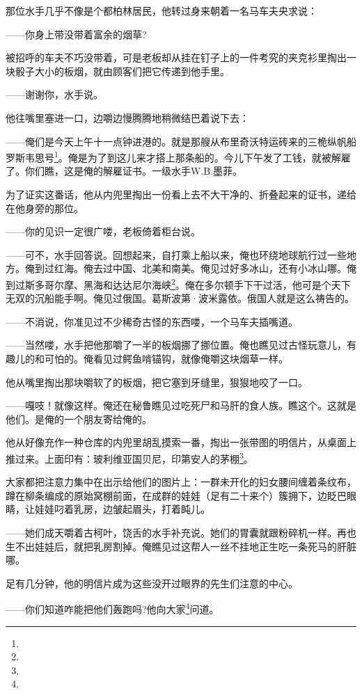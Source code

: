 \par 那位水手几乎不像是个都柏林居民，他转过身来朝着一名马车夫央求说：
\par ——你身上带没带着富余的烟草?
\par 被招呼的车夫不巧没带着，可是老板却从挂在钉子上的一件考究的夹克衫里掏出一块骰子大小的板烟，就由顾客们把它传递到他手里。
\par ——谢谢你，水手说。
\par 他往嘴里塞进一口，边嚼边慢腾腾地稍微结巴着说下去：
\par ——俺们是今天上午十一点钟进港的。就是那艘从布里奇沃特运砖来的三桅纵帆船罗斯韦思号\footnote{}。俺是为了到这儿来才搭上那条船的。今儿下午发了工钱，就被解雇了。你们瞧，这是俺的解雇证书。一级水手W.B.墨菲。
\par 为了证实这番话，他从内兜里掏出一份看上去不大干净的、折叠起来的证书，递给在他身旁的那位。
\par ——你的见识一定很广喽，老板倚着柜台说。
\par ——可不，水手回答说。回想起来，自打乘上船以来，俺也环绕地球航行过一些地方。俺到过红海。俺去过中国、北美和南美。俺见过好多冰山，还有小冰山哪。俺到过斯多哥尔摩、黑海和达达尼尔海峡\footnote{}。俺在多尔顿手下干过活，他可是个天下无双的沉船能手啊。俺见过俄国。葛斯波第·波米露依。俄国人就是这么祷告的。
\par ——不消说，你准见过不少稀奇古怪的东西喽，一个马车夫插嘴道。
\par ——当然喽，水手把他那嚼了一半的板烟挪了挪位置。俺也瞧见过古怪玩意儿，有趣儿的和可怕的。俺看见过鳄鱼啃锚钩，就像俺嚼这块烟草一样。
\par 他从嘴里掏出那块嚼软了的板烟，把它塞到牙缝里，狠狠地咬了一口。
\par ——嘎吱！就像这样。俺还在秘鲁瞧见过吃死尸和马肝的食人族。瞧这个。这就是他们。是俺的一个朋友寄给俺的。
\par 他从好像充作一种仓库的内兜里胡乱摸索一番，掏出一张带图的明信片，从桌面上推过来。上面印有：玻利维亚国贝尼，印第安人的茅棚\footnote{}。
\par 大家都把注意力集中在出示给他们的图片上：一群未开化的妇女腰间缠着条纹布，蹲在柳条编成的原始窝棚前面，在成群的娃娃（足有二十来个）簇拥下，边眨巴眼睛，让娃娃叼着乳房，边皱起眉头，打着盹儿。
\par ——她们成天嚼着古柯叶，饶舌的水手补充说。她们的胃囊就跟粉碎机一样。再也生不出娃娃后，就把乳房割掉。俺瞧见过这帮人一丝不挂地正生吃一条死马的肝脏哪。
\par 足有几分钟，他的明信片成为这些没开过眼界的先生们注意的中心。
\par ——你们知道咋能把他们轰跑吗?他向大家\footnote{}问道。
